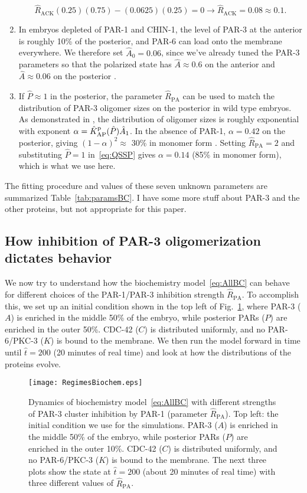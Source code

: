 \documentclass[11pt]{article}
\newcommand{\red}[1]{\color{red}#1\normalcolor}
\newcommand{\6}[1]{#1_{\text{6}}}
\newcommand{\3}[1]{#1_{\text{3}}}
\begin{document}
\begin{enumerate}
\begin{equation*}
\hat{R}_\text{ACK}(0.25)(0.75)- (0.0625)(0.25)=0 \rightarrow \hat{R}_\text{ACK}=0.08\approx 0.1.
\end{equation*}
\item In embryos depleted of PAR-1 and CHIN-1, the level of PAR-3 at the anterior is roughly 10\% of the posterior, and PAR-6 can load onto the membrane everywhere. We therefore set $\hat A_0=0.06$, since we've already tuned the PAR-3 parameters so that the polarized state has $\hat A \approx 0.6$ on the anterior and $\hat A \approx 0.06$ on the posterior \cite{lang2023oligomerization}.
\item \red{If $\hat P \approx 1$ in the posterior, the parameter $\hat R_\text{PA}$ can be used to match the distribution of PAR-3 oligomer sizes on the posterior in wild type embryos. As demonstrated in \cite{lang2023oligomerization}, the distribution of oligomer sizes is roughly exponential with exponent $\alpha=\hat{K}^\text{p}_\text{AP} (\hat P )\hat A_1$. In the absence of PAR-1, $\alpha=0.42$ on the posterior, giving $(1-\alpha)^2 \approx$ 30\% in monomer form \cite{lang2022oligomerization}. Setting $\hat R_\text{PA}=2$ and substituting $\hat P=1$ in\ \eqref{eq:QSSP} gives $\alpha=0.14$ (85\% in monomer form), which is what we use here. }
\end{enumerate}
The fitting procedure and values of these seven unknown parameters are summarized Table\ \ref{tab:paramsBC}. \red{I have some more stuff about PAR-3 and the other proteins, but not appropriate for this paper.}

\iffalse
\subsection{How inhibition of PAR-3 oligomerization dictates behavior}
We now try to understand how the biochemistry model\ \eqref{eq:AllBC} can behave for different choices of the PAR-1/PAR-3 inhibition strength $\hat R_\text{PA}$. To accomplish this, we set up an initial condition shown in the top left of Fig.\ \ref{fig:BCRegimes}, where PAR-3 ($A$) is enriched in the middle 50\% of the embryo, while posterior PARs ($P$) are enriched in the outer 50\%. CDC-42 ($C$) is distributed uniformly, and no PAR-6/PKC-3 ($K$) is bound to the membrane. We then run the model forward in time until $\hat t = 200$ (20 minutes of real time) and look at how the distributions of the proteins evolve. 

\begin{figure}
\centering
\texttt{[image: RegimesBiochem.eps]}
\caption{\label{fig:BCRegimes}Dynamics of biochemistry model\ \eqref{eq:AllBC} with different strengths of PAR-3 cluster inhibition by PAR-1 (parameter $\hat R_\text{PA}$). Top left: the initial condition we use for the simulations. PAR-3 ($A$) is enriched in the middle 50\% of the embryo, while posterior PARs ($P$) are enriched in the outer 10\%. CDC-42 ($C$) is distributed uniformly, and no PAR-6/PKC-3 ($K$) is bound to the membrane. The next three plots show the state at $\hat t = 200$ (about 20 minutes of real time) with three different values of $\hat R_\text{PA}$. }
\end{figure}
\end{document}
